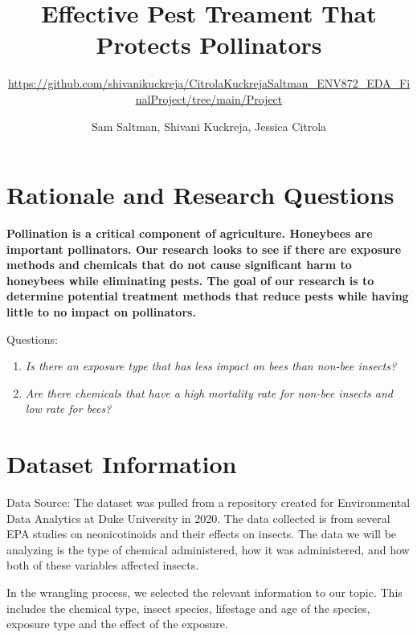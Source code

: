 \documentclass[
  12pt,
]{article}
\title{Effective Pest Treament That Protects Pollinators}
\subtitle{\url{https://github.com/shivanikuckreja/CitrolaKuckrejaSaltman_ENV872_EDA_FinalProject/tree/main/Project}}
\author{Sam Saltman, Shivani Kuckreja, Jessica Citrola}
\date{}
\begin{document}
\maketitle

\newpage
\tableofcontents 
\newpage
\listoftables 
\newpage
\listoffigures 
\newpage

\hypertarget{rationale-and-research-questions}{%
\section{Rationale and Research
Questions}\label{rationale-and-research-questions}}

\textbf{Pollination is a critical component of agriculture. Honeybees
are important pollinators. Our research looks to see if there are
exposure methods and chemicals that do not cause significant harm to
honeybees while eliminating pests. The goal of our research is to
determine potential treatment methods that reduce pests while having
little to no impact on pollinators.}

Questions:

\begin{enumerate}
\def\labelenumi{\arabic{enumi}.}
\item
  \emph{Is there an exposure type that has less impact on bees than
  non-bee insects?}
\item
  \emph{Are there chemicals that have a high mortality rate for non-bee
  insects and low rate for bees?}
\end{enumerate}

\newpage

\hypertarget{dataset-information}{%
\section{Dataset Information}\label{dataset-information}}

Data Source: The dataset was pulled from a repository created for
Environmental Data Analytics at Duke University in 2020. The data
collected is from several EPA studies on neonicotinoids and their
effects on insects. The data we will be analyzing is the type of
chemical administered, how it was administered, and how both of these
variables affected insects.

In the wrangling process, we selected the relevant information to our
topic. This includes the chemical type, insect species, lifestage and
age of the species, exposure type and the effect of the exposure.
\end{document}
